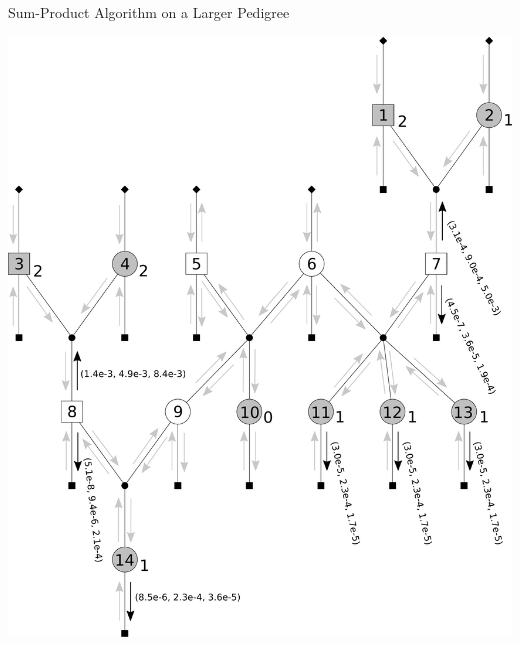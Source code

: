 \documentclass[letter,graphicx]{beamer}
\begin{document}
\begin{frame}{Sum-Product Algorithm on a Larger Pedigree} 
\begin{center} 
\includegraphics[height = 0.8\textheight]{./images/mg-example-step10.pdf} 
\end{center}
\end{frame}
\end{document}
